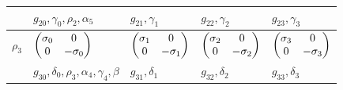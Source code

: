 \documentclass[10pt]{beamer}
\begin{document}
\begin{frame}[shrink=20]{}
\begin{table}[]
\begin{tabular}{l l  l  l  l }
\\
&  $g_{20}, \gamma_0, \rho_2, \alpha_5$ & $g_{21}, \gamma_1$  & $g_{22}, \gamma_2$ & $g_{23}, \gamma_3$ \\
\hline
$\rho_3$ 
& $\begin{pmatrix}\sigma_0 & 0\cr 0 & -\sigma_0\end{pmatrix}$  
& $\begin{pmatrix}\sigma_1 & 0\cr 0 & -\sigma_1\end{pmatrix}$ 
& $\begin{pmatrix}\sigma_2 & 0\cr 0 & -\sigma_2\end{pmatrix}$ 
& $\begin{pmatrix}\sigma_3 & 0\cr 0 & -\sigma_3\end{pmatrix}$
\\
 &$g_{30}, \delta_0, \rho_3, \alpha_4, \gamma_4 , \beta$ & $g_{31}, \delta_1$  & $g_{32}, \delta_2$ & $g_{33}, \delta_3$ \\
\hline
\end{tabular}
\end{table}

\end{frame}
\end{document}
